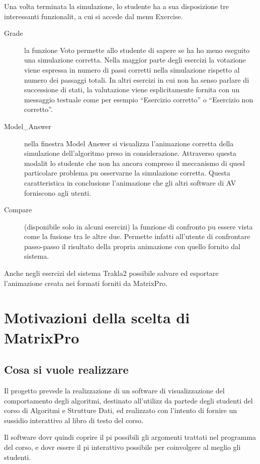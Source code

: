 Una volta terminata la simulazione, lo studente ha a sua disposizione
tre interessanti funzionalit, a cui si accede dal menu Exercise.
\begin{description}
\item [{Grade}] la funzione Voto permette allo studente di sapere se ha
ho meno eseguito una simulazione corretta. Nella maggior parte degli
esercizi la votazione viene espressa in numero di passi corretti nella
simulazione rispetto al numero dei passaggi totali. In altri esercizi
in cui non ha senso parlare di successione di stati, la valutazione
viene esplicitamente fornita con un messaggio testuale come per esempio
{}``Esercizio corretto'' o {}``Esercizio non corretto''.
\item [{Model\_Answer}] nella finestra Model Answer si visualizza l'animazione
corretta della simulazione dell'algoritmo preso in considerazione.
Attraverso questa modalit lo studente che non ha ancora compreso
il meccanismo di quesl particolare problema pu osservarne la simulazione
corretta. Questa caratteristica in conclusione  l'animazione che
gli altri software di AV forniscono agli utenti.
\item [{Compare}] (disponibile solo in alcuni esercizi) la funzione di
confronto pu essere vista come la fusione tra le altre due. Permette
infatti all'utente di confrontare passo-passo il risultato della propria
animazione con quello fornito dal sistema.
\end{description}
Anche negli esercizi del sistema Trakla2  possibile salvare ed esportare
l'animazione creata nei formati forniti da MatrixPro.


\section{Motivazioni della scelta di MatrixPro}


\subsection{Cosa si vuole realizzare}

Il progetto prevede la realizzazione di un software di visualizzazione
del comportamento degli algoritmi, destinato all'utilizz da partede
degli studenti del corso di Algoritmi e Strutture Dati, ed  realizzato
con l'intento di fornire un sussidio interattivo al libro di testo
del corso.

Il software dovr quindi coprire il pi possibili gli argomenti trattati
nel programma del corso, e dovr essere il pi interattivo possibile
per coinvolgere al meglio gli studenti.


